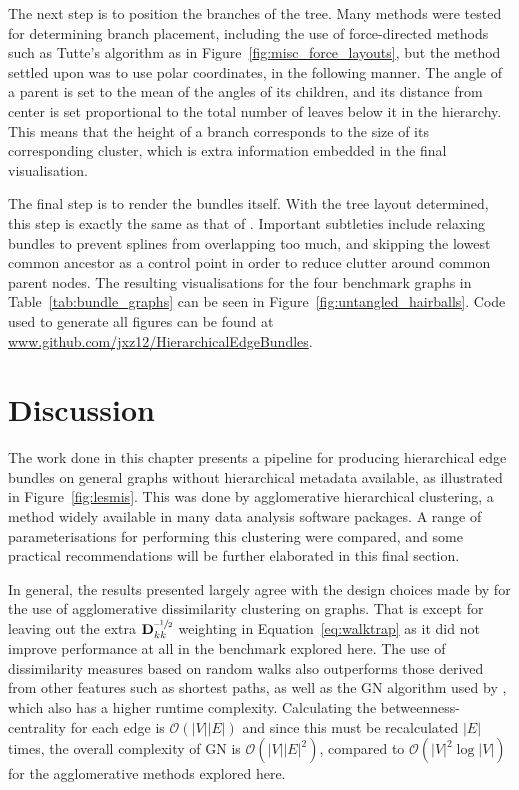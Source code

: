 The next step is to position the branches of the tree. Many methods were tested for determining branch placement, including the use of force-directed methods such as Tutte's algorithm as in Figure~\ref{fig:misc_force_layouts}, but the method settled upon was to use polar coordinates, in the following manner.
The angle of a parent is set to the mean of the angles of its children, and its distance from center is set proportional to the total number of leaves below it in the hierarchy. This means that the height of a branch corresponds to the size of its corresponding cluster, which is extra information embedded in the final visualisation.

The final step is to render the bundles itself. With the tree layout determined, this step is exactly the same as that of \citet{Holten2006}. Important subtleties include relaxing bundles to prevent splines from overlapping too much, and skipping the lowest common ancestor as a control point in order to reduce clutter around common parent nodes.
The resulting visualisations for the four benchmark graphs in Table~\ref{tab:bundle_graphs} can be seen in Figure~\ref{fig:untangled_hairballs}.
Code used to generate all figures can be found at \url{www.github.com/jxz12/HierarchicalEdgeBundles}. 


\section{Discussion}
\label{sec:heb_discussion}
The work done in this chapter presents a pipeline for producing hierarchical edge bundles \citep{Holten2006} on general graphs without hierarchical metadata available, as illustrated in Figure~\ref{fig:lesmis}. This was done by agglomerative hierarchical clustering, a method widely available in many data analysis software packages. A range of parameterisations for performing this clustering were compared, and some practical recommendations will be further elaborated in this final section.

In general, the results presented largely agree with the design choices made by \citet{Pons2006} for the use of agglomerative dissimilarity clustering on graphs. That is except for leaving out the extra $\mathbf{D}_{kk}^{\text{--}\sfrac{1}{2}}$ weighting in Equation~\ref{eq:walktrap} as it did not improve performance at all in the benchmark explored here.
The use of dissimilarity measures based on random walks also outperforms those derived from other features such as shortest paths, as well as the GN algorithm used by \citet{Jia2011}, which also has a higher runtime complexity.
Calculating the betweenness-centrality for each edge is $\mathcal{O}(|V||E|)$ \citep{Brandes2001Centrality} and since this must be recalculated $|E|$ times, the overall complexity of GN is $\mathcal{O}(|V||E|^2)$, compared to $\mathcal{O}(|V|^2\log|V|)$ for the agglomerative methods explored here.

